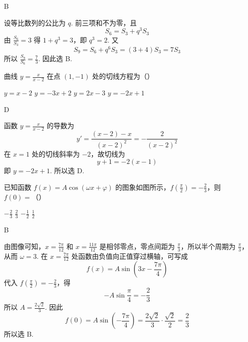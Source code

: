 \begin{answer}
B
\end{answer}

\begin{solution}
设等比数列的公比为 \(q\). 前三项和不为零，且
\[
S_6=S_3+q^3S_3
\]
由 \(\frac{S_6}{S_3}=3\) 得 \(1+q^3=3\)，即 \(q^3=2\). 又
\[
S_9=S_6+q^6S_3=(3+4)S_3=7S_3
\]
所以 \(\frac{S_9}{S_6}=\frac73\). 因此选 B.
\end{solution}

\begin{problem}
曲线 \(y = \frac{x}{x - 2}\) 在点 \((1,-1)\) 处的切线方程为（\quad）

\choices
    {\(y = x - 2\)}
    {\(y = -3x + 2\)}
    {\(y = 2x - 3\)}
    {\(y = -2x + 1\)}
\end{problem}

\begin{answer}
D
\end{answer}

\begin{solution}
函数 \(y=\frac{x}{x-2}\) 的导数为
\[
y'=\frac{(x-2)-x}{(x-2)^2}=-\frac{2}{(x-2)^2}
\]
在 \(x=1\) 处的切线斜率为 \(-2\)，故切线为
\[
y+1=-2(x-1)
\]
即 \(y=-2x+1\). 所以选 D.
\end{solution}

\begin{problem}
已知函数 \(f(x) = A\cos (\omega x + \varphi)\) 的图象如图所示，\(f\left(\frac{\pi}{2}\right) = -\frac{2}{3}\)，则 \(f(0) =\)（\quad）


\choices
    {\(-\frac{2}{3}\)}
    {\( \frac{2}{3} \)}
    {\(-\frac{1}{2}\)}
    {\(\frac{1}{2}\)}
\end{problem}

\begin{answer}
B
\end{answer}

\begin{solution}
由图像可知，\(x=\frac{7\pi}{12}\) 和 \(x=\frac{11\pi}{12}\) 是相邻零点，零点间距为 \(\frac\pi3\)，所以半个周期为 \(\frac\pi3\)，从而 \(\omega=3\). 在 \(x=\frac{7\pi}{12}\) 处函数由负值向正值穿过横轴，可写成
\[
f(x)=A\sin\left(3x-\frac{7\pi}{4}\right)
\]
代入 \(f\left(\frac\pi2\right)=-\frac23\)，得
\[
-A\sin\frac\pi4=-\frac23
\]
所以 \(A=\frac{2\sqrt2}{3}\). 因此
\[
f(0)=A\sin\left(-\frac{7\pi}{4}\right)=\frac{2\sqrt2}{3}\cdot\frac{\sqrt2}{2}=\frac23
\]
所以选 B.
\end{solution}


